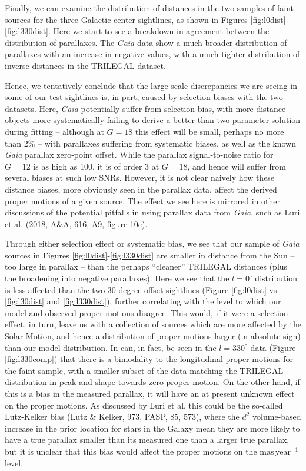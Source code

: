 \documentclass[fleqn,usenatbib]{mnras}
\begin{document}
Finally, we can examine the distribution of distances in the two samples of faint sources for the three Galactic center sightlines, as shown in Figures \ref{fig:l0dist}-\ref{fig:l330dist}.
Here we start to see a breakdown in agreement between the distribution of parallaxes.
The \textit{Gaia} data show a much broader distribution of parallaxes with an increase in negative values, with a much tighter distribution of inverse-distances in the TRILEGAL dataset.

Hence, we tentatively conclude that the large scale discrepancies we are seeing in some of our test sightlines is, in part, caused by selection biases with the two datasets.
Here, \textit{Gaia} potentially suffer from selection bias, with more distance objects more systematically failing to derive a better-than-two-parameter solution during fitting -- although at $G = 18$ this effect will be small, perhaps no more than 2\% -- with parallaxes suffering from systematic biases, as well as the known \textit{Gaia} parallax zero-point offset.
While the parallax signal-to-noise ratio for $G=12$ is as high as 100, it is of order 3 at $G=18$, and hence will suffer from several biases at such low SNRs.
However, it is not clear naively how these distance biases, more obviously seen in the parallax data, affect the derived proper motions of a given source.
The effect we see here is mirrored in other discussions of the potential pitfalls in using parallax data from \textit{Gaia}, such as Luri et al. (2018, A\&A, 616, A9, figure 10c).

Through either selection effect or systematic bias, we see that our sample of \textit{Gaia} sources in Figures \ref{fig:l0dist}-\ref{fig:l330dist} are smaller in distance from the Sun -- too large in parallax -- than the perhaps ``cleaner'' TRILEGAL distances (plus the broadening into negative parallaxes).
Here we see that the $l = 0^\circ$ distribution is less affected than the two 30-degree-offset sightlines (Figure \ref{fig:l0dist} vs \ref{fig:l30dist} and \ref{fig:l330dist}), further correlating with the level to which our model and observed proper motions disagree.
This would, if it were a selection effect, in turn, leave us with a collection of sources which are more affected by the Solar Motion, and hence a distribution of proper motions larger (in absolute sign) than our model distribution.
In can, in fact, be seen in the $l = 330^\circ$ data (Figure \ref{fig:l330comp}) that there is a bimodality to the longitudinal proper motions for the faint sample, with a smaller subset of the data matching the TRILEGAL distribution in peak and shape towards zero proper motion.
On the other hand, if this is a bias in the measured parallax, it will have an at present unknown effect on the proper motions.
As discussed by Luri et al. this could be the so-called Lutz-Kelker bias (Lutz \& Kelker, 973, PASP, 85, 573), where the $d^2$ volume-based increase in the prior location for stars in the Galaxy mean they are more likely to have a true parallax smaller than its measured one than a larger true parallax, but it is unclear that this bias would affect the proper motions on the $\mathrm{mas}\,\mathrm{year}^{-1}$ level.
\end{document}

